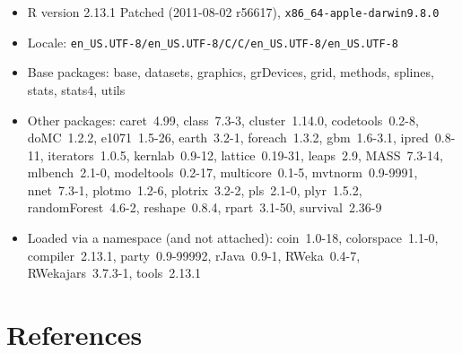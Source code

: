 \documentclass[12pt]{article}
\begin{document}
\begin{itemize}\raggedright
  \item R version 2.13.1 Patched (2011-08-02 r56617), \verb|x86_64-apple-darwin9.8.0|
  \item Locale: \verb|en_US.UTF-8/en_US.UTF-8/C/C/en_US.UTF-8/en_US.UTF-8|
  \item Base packages: base, datasets, graphics, grDevices, grid,
    methods, splines, stats, stats4, utils
  \item Other packages: caret~4.99, class~7.3-3, cluster~1.14.0,
    codetools~0.2-8, doMC~1.2.2, e1071~1.5-26, earth~3.2-1,
    foreach~1.3.2, gbm~1.6-3.1, ipred~0.8-11, iterators~1.0.5,
    kernlab~0.9-12, lattice~0.19-31, leaps~2.9, MASS~7.3-14,
    mlbench~2.1-0, modeltools~0.2-17, multicore~0.1-5,
    mvtnorm~0.9-9991, nnet~7.3-1, plotmo~1.2-6, plotrix~3.2-2,
    pls~2.1-0, plyr~1.5.2, randomForest~4.6-2, reshape~0.8.4,
    rpart~3.1-50, survival~2.36-9
  \item Loaded via a namespace (and not attached): coin~1.0-18,
    colorspace~1.1-0, compiler~2.13.1, party~0.9-99992, rJava~0.9-1,
    RWeka~0.4-7, RWekajars~3.7.3-1, tools~2.13.1
\end{itemize}

\section{References}
\end{document}
